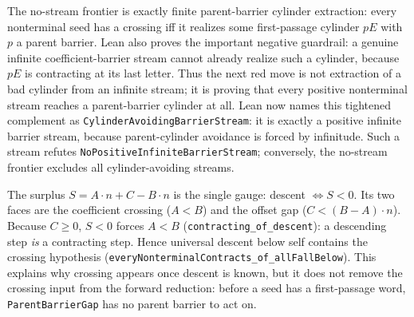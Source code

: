 \begin{theorem}
  \label{thm:collatz-no-stream-parent-cylinder-extraction}
  \leanok
  The no-stream frontier is exactly finite parent-barrier cylinder extraction:
  every nonterminal seed has a crossing iff it realizes some first-passage
  cylinder \(pE\) with \(p\) a parent barrier. Lean also proves the important
  negative guardrail: a genuine infinite coefficient-barrier stream cannot
  already realize such a cylinder, because \(pE\) is contracting at its last
  letter. Thus the next red move is not extraction of a bad cylinder from an
  infinite stream; it is proving that every positive nonterminal stream reaches
  a parent-barrier cylinder at all. Lean now names this tightened complement as
  \texttt{CylinderAvoidingBarrierStream}: it is exactly a positive infinite
  barrier stream, because parent-cylinder avoidance is forced by infinitude.
  Such a stream refutes \texttt{NoPositiveInfiniteBarrierStream}; conversely,
  the no-stream frontier excludes all cylinder-avoiding streams.
\end{theorem}
\begin{theorem}
  \label{thm:collatz-purl}
  \leanok
  The surplus $S=A\cdot n+C-B\cdot n$ is the single gauge: descent $\iff S<0$. Its two faces are
  the coefficient crossing ($A<B$) and the offset gap ($C<(B-A)\cdot n$). Because $C\ge0$, $S<0$
  forces $A<B$ (\texttt{contracting\_of\_descent}): a descending step \emph{is} a contracting step.
  Hence universal descent below self contains the crossing hypothesis
  (\texttt{everyNonterminalContracts\_of\_allFallBelow}). This explains why crossing appears once
  descent is known, but it does not remove the crossing input from the forward reduction: before a
  seed has a first-passage word, \texttt{ParentBarrierGap} has no parent barrier to act on.
\end{theorem}
